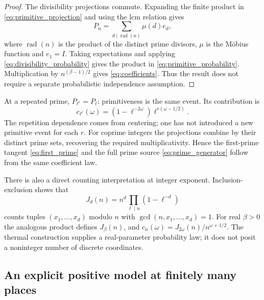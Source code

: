 \begin{proof}
The divisibility projections commute. Expanding the finite product in
\eqref{eq:primitive_projection} and using the lcm relation gives
\begin{equation}
 P_n=\sum_{d\mid\operatorname{rad}(n)}\mu(d)e_d,
\end{equation}
where $\operatorname{rad}(n)$ is the product of the distinct prime
divisors, $\mu$ is the M\"obius function and $e_1=I$.
Taking expectations and applying \eqref{eq:divisibility_probability}
gives the product in \eqref{eq:primitive_probability}. Multiplication
by $n^{(\beta-1)/2}$ gives \eqref{eq:coefficients}. Thus the result
does not require a separate probabilistic independence assumption.
\end{proof}

At a repeated prime, $P_{\ell^r}=P_\ell$: primitiveness is the same
event. Its contribution is
\begin{equation}
 c_{\ell^r}(\omega)
 =(1-\ell^{-2\omega})\ell^{r(\omega-1/2)}.
\end{equation}
The repetition dependence comes from centering; one has not introduced
a new primitive event for each $r$. For coprime integers the projections
combine by their distinct prime sets, recovering the required
multiplicativity. Hence the first-prime tangent
\eqref{eq:first_prime} and the full prime source
\eqref{eq:prime_generator} follow from the same coefficient law.

There is also a direct counting interpretation at integer exponent.
Inclusion-exclusion shows that
\begin{equation}
 J_d(n)=n^d\prod_{\ell\mid n}(1-\ell^{-d})
\end{equation}
counts tuples $(x_1,\ldots,x_d)$ modulo $n$ with
$\gcd(n,x_1,\ldots,x_d)=1$. For real $\beta>0$ the analogous product
defines $J_\beta(n)$, and $c_n(\omega)=J_{2\omega}(n)/n^{\omega+1/2}$.
The thermal construction supplies a real-parameter probability law;
it does not posit a noninteger number of discrete coordinates.

\subsection{An explicit positive model at finitely many places}

